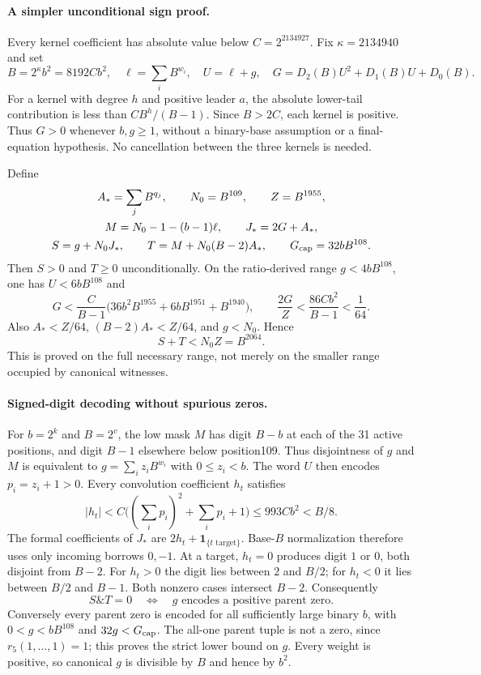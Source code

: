 \paragraph{A simpler unconditional sign proof.}
Every kernel coefficient has absolute value below $C=2^{2134927}$.
Fix $\kappa=2134940$ and set
\[
 B=2^\kappa b^2=8192Cb^2,\quad \ell=\sum_iB^{w_i},\quad U=\ell+g,
 \quad G=D_2(B)U^2+D_1(B)U+D_0(B).
\]
For a kernel with degree $h$ and positive leader $a$, the absolute lower-tail
contribution is less than $CB^h/(B-1)$. Since $B>2C$, each kernel is positive.
Thus $G>0$ whenever $b,g\ge1$, without a binary-base assumption or a
final-equation hypothesis. No cancellation between the three kernels is needed.

Define
\[
\begin{gathered}
 A_* =\sum_jB^{q_j},\qquad N_0=B^{109},\qquad Z=B^{1955},\\
 M=N_0-1-(b-1)\ell,\qquad J_*=2G+A_*,\\
 S=g+N_0J_*,\qquad T=M+N_0(B-2)A_*,\qquad G_{\rm cap}=32bB^{108}.
\end{gathered}
\]
Then $S>0$ and $T\ge0$ unconditionally. On the ratio-derived range
$g<4bB^{108}$, one has $U<6bB^{108}$ and
\[
 G<\frac{C}{B-1}
 \bigl(36b^2B^{1955}+6bB^{1951}+B^{1940}\bigr),\qquad
 \frac{2G}{Z}<\frac{86Cb^2}{B-1}<\frac1{64}.
\]
Also $A_*<Z/64$, $(B-2)A_*<Z/64$, and $g<N_0$. Hence
\[
 S+T<N_0Z=B^{2064}.
\]
This is proved on the full necessary range, not merely on the smaller
range occupied by canonical witnesses.

\paragraph{Signed-digit decoding without spurious zeros.}
For $b=2^k$ and $B=2^v$, the low mask $M$ has digit $B-b$ at each of the
31 active positions, and digit $B-1$ elsewhere below position109.
Thus disjointness of $g$ and $M$ is equivalent to
$g=\sum_i z_iB^{w_i}$ with $0\le z_i<b$. The word $U$ then encodes
$p_i=z_i+1>0$. Every convolution coefficient $h_t$ satisfies
\[
 |h_t|<C\bigl((\textstyle\sum_i p_i)^2+\sum_i p_i+1\bigr)
 \le993Cb^2<B/8.
\]
The formal coefficients of $J_*$ are $2h_t+\mathbf1_{\{t\text{ target}\}}$.
Base-$B$ normalization therefore uses only incoming borrows $0,-1$.
At a target, $h_t=0$ produces digit $1$ or $0$, both disjoint from $B-2$.
For $h_t>0$ the digit lies between $2$ and $B/2$; for $h_t<0$ it lies
between $B/2$ and $B-1$. Both nonzero cases intersect $B-2$.
Consequently
\[
 S\mathbin{\&}T=0
 \quad\Longleftrightarrow\quad
 g\text{ encodes a positive parent zero}.
\]
Conversely every parent zero is encoded for all sufficiently large binary
$b$, with $0<g<bB^{108}$ and $32g<G_{\rm cap}$.
The all-one parent tuple is not a zero, since $r_5(1,\ldots,1)=1$;
this proves the strict lower bound on $g$. Every weight is positive, so
canonical $g$ is divisible by $B$ and hence by $b^2$.

